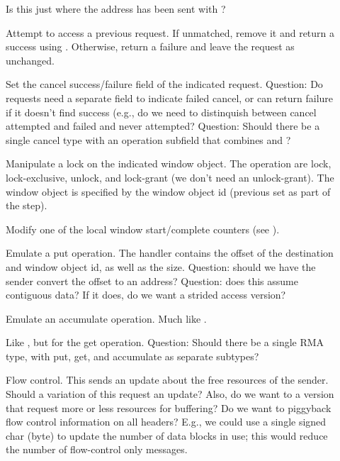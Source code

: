 \documentclass{article}
\begin{document}
\begin{tcp}
\begin{description}
\item[]Is this just 
where the address has been sent with ?

\item[]Attempt to access a previous
request.  If unmatched, remove it and return a success
 using .
Otherwise, return a failure and leave the request as unchanged.

\item[]Set the cancel success/failure
field of the indicated request.  Question: Do requests need a separate
field to indicate failed cancel, or can 
return failure if it doesn't find success (e.g., do we need to
distinquish between cancel attempted and failed and never attempted?
Question: Should there be a single cancel type with an operation
subfield that combines  and
?

\item[]Manipulate a lock on the indicated
window object.  The operation are lock, lock-exclusive, unlock, and
lock-grant (we don't need an unlock-grant).  The window object is
specified by the window object id (previous set as part of the
 step).

\item[]Modify one of the local window
start/complete counters (see ).  

\item[]Emulate a put operation.  The handler
contains the offset of the destination and window object id, as well
as the size.  
Question: should we have the sender convert the offset to an address?
Question: does this assume contiguous data?  If it does, do we want a
strided access version?

\item[]Emulate an accumulate
operation.  Much like .

\item[]Like , but for
the get operation.  Question: Should there be a single RMA type, with
put, get, and accumulate as separate subtypes?

\item[]Flow control.  This sends an update
about the free resources of the sender.  Should a variation of this
request an update?  Also, do we want to a version that request more or
less resources for buffering?  Do we want to piggyback flow control
information on all headers?  E.g., we could use a single signed char
(byte) to update the number of data blocks in use; this would reduce
the number of flow-control only messages.


\end{description}
\end{tcp}
\end{document}
